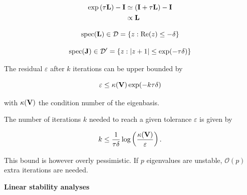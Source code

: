 \documentclass[aspectratio=169, usenames, dvipsnames]{beamer}
\begin{document}
\begin{frame}
  \vfill
  {
    \Large
    \[
      \begin{aligned}
        \exp\left( \tau \vb{L} \right) - \vb{I} & \simeq \left( \vb{I} + \tau \vb{L} \right) - \vb{I} \\
        & \propto \vb{L}
      \end{aligned}
    \]
  }
  \vfill
\end{frame}

\begin{frame}
  \vfill
  {
    \Large
    \[
      \mathrm{spec}(\vb{L}) \in \mathcal{D} = \left\{ z : \Re(z) \leq -\delta \right\}
    \]
  }
  \vfill
\end{frame}

\begin{frame}
  \vfill
  {
    \Large
    \[
      \mathrm{spec}(\vb{J}) \in \mathcal{D}^{\prime} = \left\{ z : \abs{z +1} \leq \exp(-\tau \delta) \right\}
    \]
  }
  \vfill
\end{frame}

\begin{frame}
  \vfill

  \centering
  The residual $\varepsilon$ after $k$ iterations can be upper bounded by

  {
    \Large
    \[
      \varepsilon \leq \kappa(\vb{V}) \exp(-k \tau \delta)
    \]
  }

  \bigskip
  
  with $\kappa(\vb{V})$ the condition number of the eigenbasis.

  \vfill
\end{frame}

\begin{frame}
  \vfill
  
  The number of iterations $k$ needed to reach a given tolerance $\varepsilon$ is given by

  {
    \Large
    \[
      k \leq \dfrac{1}{\tau \delta} \log \left( \dfrac{\kappa(\vb{V})}{\varepsilon} \right).
    \]
  }

  \bigskip

  This bound is however overly pessimistic. If $p$ eigenvalues are unstable, $\mathcal{O}(p)$ extra iterations are needed.
  
  \vfill
\end{frame}



\begin{frame}
  \vfill
  \begin{minipage}{.48\textwidth}
  \end{minipage}%
  \hfill
  \begin{minipage}{.48\textwidth}
    \centering
    {
      \huge
      \textbf{Linear stability analyses}
    }
  \end{minipage}
  \vfill
\end{frame}
\end{document}
